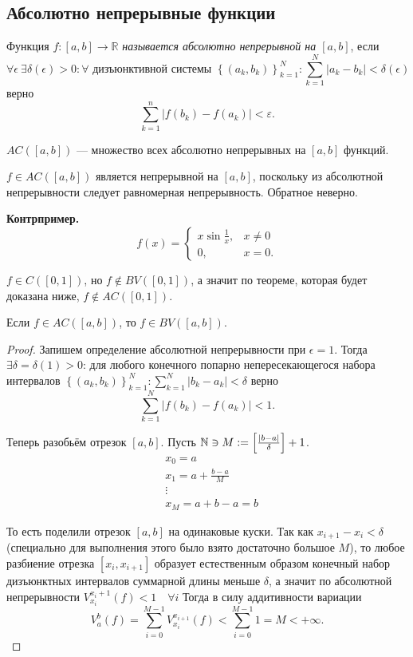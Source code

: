 \subsection{Абсолютно непрерывные функции}
\begin{definition}
    Функция $f:[a, b] \rightarrow \mathbb{R}$ \textit{называется абсолютно непрерывной на $[a, b]$}, если
$$
\forall \epsilon \ \exists \delta(\epsilon)>0: \forall \text { дизъюнктивной системы }\left\{\left(a_k, b_k\right)\right\}_{k=1}^N: \sum_{k=1}^N\left|a_k-b_k\right|<\delta(\epsilon)
$$
верно
$$\sum_{k=1}^n\left|f\left(b_k\right)-f\left(a_k\right)\right|<\varepsilon.$$
\end{definition} 

$AC([a, b])$ — множество всех абсолютно непрерывных на $[a, b]$ функций.

\begin{remark}
    $f \in A C([a, b])$ является непрерывной на $[a, b]$, поскольку из абсолютной непрерывности следует равномерная непрерывность. Обратное неверно.
\end{remark}

\noindent\textbf{Контрпример.}
$$
f(x)=\left\{\begin{array}{ll}
x \sin \frac{1}{x}, & x \neq 0 \\
0, & x=0.
\end{array}\right.
$$

$f \in C([0,1])$, но $f \notin B V([0,1])$, а значит по теореме, которая будет доказана ниже, $f \notin A C([0,1])$.

\begin{theorem}
    Если $f \in A C([a, b])$, то $f \in B V([a, b])$.
\end{theorem} 
\begin{proof}
    Запишем определение абсолютной непрерывности при $\epsilon=1$. Тогда $\exists \delta=\delta(1)> 0$: для любого конечного попарно непересекающегося набора интервалов $\left\{\left(a_k, b_k\right)\right\}_{k=1}^N: \sum_{k=1}^N\left|b_k-a_k\right|<\delta$ верно
    $$
    \sum_{k=1}^N\left|f\left(b_k\right)-f\left(a_k\right)\right|<1 .
    $$

    Теперь разобьём отрезок $[a, b]$. Пусть $\mathbb{N} \ni M:=\left[\frac{|b-a|}{\delta}\right]+1$.
    $$
    \begin{aligned}
    & x_0=a \\
    & x_1=a+\frac{b-a}{M} \\
    & \vdots \\
    & x_M=a+b-a=b
    \end{aligned}
    $$

    То есть поделили отрезок $[a, b]$ на одинаковые куски.
    Так как $x_{i+1}-x_i<\delta$ (специально для выполнения этого было взято достаточно большое $M$), то любое разбиение отрезка $\left[x_i, x_{i+1}\right]$ образует естественным образом конечный набор дизъюнктных интервалов суммарной длины меньше $\delta$, а значит по абсолютной непрерывности $V_{x_i}^{x_i+1}(f)<1 \quad \forall i$ Тогда в силу аддитивности вариации
    $$
    V_a^b(f)=\sum_{i=0}^{M-1} V_{x_i}^{x_{i+1}}(f)<\sum_{i=0}^{M-1} 1=M<+\infty.
    $$
\end{proof} 


